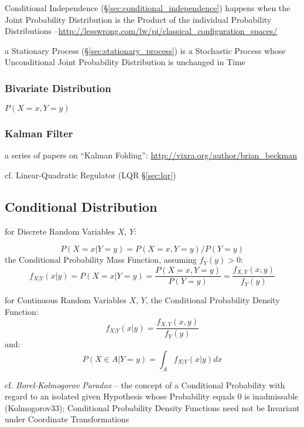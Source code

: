 Conditional Independence (\S\ref{sec:conditional_independence}) happens when
the Joint Probability Distribution is the Product of the individual Probability
Distributions
--\url{http://lesswrong.com/lw/pi/classical_configuration_spaces/}

\fist a Stationary Process (\S\ref{sec:stationary_process}) is a Stochastic
Process whose Unconditional Joint Probability Distribution is unchanged in Time



\subsubsection{Bivariate Distribution}\label{sec:bivariate_distribution}

$P(X = x, Y = y)$



\subsubsection{Kalman Filter}\label{sec:kalman_filter}

a series of papers on ``Kalman Folding'':
\url{http://vixra.org/author/brian_beckman}

cf. Linear-Quadratic Regulator (LQR \S\ref{sec:lqr})



\subsection{Conditional Distribution}
\label{sec:conditional_distribution}

for Discrete Random Variables $X$, $Y$:

\[
  P(X = x | Y = y) = P(X = x, Y = y)/P(Y = y)
\]
the Conditional Probability Mass Function, assuming $f_Y(y) > 0$:
\[
  f_{X|Y}(x|y) = P(X = x|Y = y) =
    \frac{P(X = x, Y = y)}{P(Y = y)} =
    \frac{f_{X,Y}(x,y)}{f_Y(y)}
\]

for Continuous Random Variables $X$, $Y$, the Conditional Probability Density
Function:
\[
  f_{X|Y}(x|y) = \frac{f_{X,Y}(x,y)}{f_Y(y)}
\]
and:
\[
  P(X \in A| Y = y) = \int_A f_{X|Y}(x|y) dx
\]

cf. \emph{Borel-Kolmogorov Paradox} -- the concept of a Conditional Probability
with regard to an isolated given Hypothesis whose Probability equals $0$ is
inadmissable (Kolmogorov33); Conditional Probability Density Functions need not
be Invariant under Coordinate Transformations



